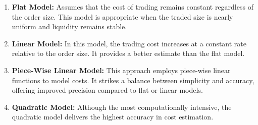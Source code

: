 \begin{definition} 
\begin{enumerate}[label=\roman*.]
\setlength{\itemsep}{0pt}
    \item \textbf{Flat Model:} Assumes that the cost of trading remains constant regardless of the order size. This model is appropriate when the traded size is nearly uniform and liquidity remains stable.
    \item \textbf{Linear Model:} In this model, the trading cost increases at a constant rate relative to the order size. It provides a better estimate than the flat model.  
    \item \textbf{Piece-Wise Linear Model:} This approach employs piece-wise linear functions to model costs. It strikes a balance between simplicity and accuracy, offering improved precision compared to flat or linear models.
    \item \textbf{Quadratic Model:} Although the most computationally intensive, the quadratic model delivers the highest accuracy in cost estimation.
\end{enumerate}
\end{definition}
